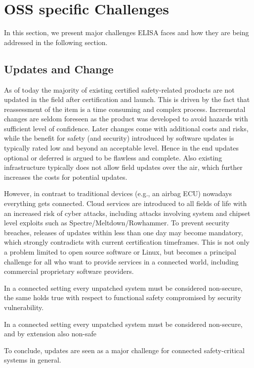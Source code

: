 \documentclass[12pt]{ElisaPaper}
\begin{document}
\section{OSS specific Challenges}
\label{sec:OSS specific Challenges}
In this section, we present major challenges ELISA faces and how they are being addressed in the following section.

\subsection{Updates and Change}
\label{ssec:Updates and Change}
As of today the majority of existing certified safety-related products are not updated in the field after certification and launch.
This is driven by the fact that reassessment of the item is a time consuming and complex process.
Incremental changes are seldom foreseen as the product was developed to avoid hazards with sufficient level of confidence.
Later changes come with additional costs and risks, while the benefit for safety (and security) introduced by software updates is typically rated low and beyond an acceptable level.
Hence in the end updates optional or deferred is argued to be flawless and complete.
Also existing infrastructure typically does not allow field updates over the air, which further increases the costs for potential updates. 

However, in contrast to traditional devices (e.g., an airbag ECU) nowadays everything gets connected.
Cloud services are introduced to all fields of life with an increased risk of cyber attacks, including attacks involving system and chipset level exploits such as  Spectre/Meltdown/Rowhammer. 
To prevent security breaches, releases of updates within less than one day may become mandatory, which strongly contradicts with current certification timeframes.
This is not only a problem limited to open source software or Linux, but becomes a principal challenge for all who want to provide services in a connected world, including commercial proprietary software providers.

In a connected setting every unpatched system must be considered non-secure, the same holds true with respect to functional safety compromised by security vulnerability.

In a connected setting every unpatched system must be considered non-secure, and by extension also non-safe

To conclude, updates are seen as a major challenge for connected safety-critical systems in general.
\end{document}
